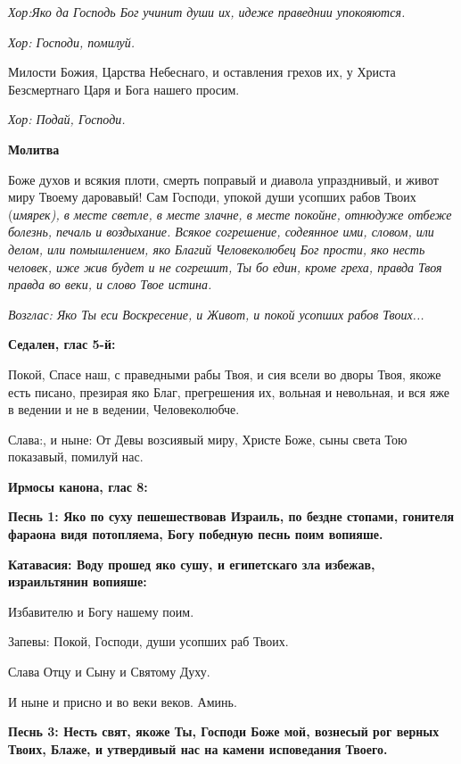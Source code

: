 \itshape Хор:Яко да Господь Бог учинит души их, идеже праведнии упокояются. 

\normalfont{}\itshape Хор:\normalfont{} Господи, помилуй. 

Милости Божия, Царства Небеснаго, и оставления грехов их, у Христа Безсмертнаго Царя и Бога нашего просим. 

\itshape Хор:\normalfont{} Подай, Господи.


\medskip


\bfseries Молитва\normalfont{}


Боже духов и всякия плоти, смерть поправый и диавола упразднивый, и живот миру Твоему даровавый! Сам Господи, упокой души усопших рабов Твоих (\itshape имярек\normalfont{}), в месте светле, в месте злачне, в месте покойне, отнюдуже отбеже болезнь, печаль и воздыхание. Всякое согрешение, содеянное ими, словом, или делом, или помышлением, яко Благий Человеколюбец Бог прости, яко несть человек, иже жив будет и не согрешит, Ты бо един, кроме греха, правда Твоя правда во веки, и слово Твое истина. 

\itshape Возглас:\normalfont{} Яко Ты еси Воскресение, и Живот, и покой усопших рабов Твоих...


\medskip


\bfseries Седален, глас 5-й:\normalfont{}


Покой, Спасе наш, с праведными рабы Твоя, и сия всели во дворы Твоя, якоже есть писано, презирая яко Благ, прегрешения их, вольная и невольная, и вся яже в ведении и не в ведении, Человеколюбче. 

Слава:, и ныне: От Девы возсиявый миру, Христе Боже, сыны света Тою показавый, помилуй нас.


\medskip


\bfseries Ирмосы канона, глас 8:\normalfont{}


\bfseries Песнь 1:\normalfont{} Яко по суху пешешествовав Израиль, по бездне стопами, гонителя фараона видя потопляема, Богу победную песнь поим вопияше. 

\bfseries Катавасия:\normalfont{} Воду прошед яко сушу, и египетскаго зла избежав, израильтянин вопияше: 

Избавителю и Богу нашему поим. 

Запевы: Покой, Господи, души усопших раб Твоих. 

Слава Отцу и Сыну и Святому Духу. 

И ныне и присно и во веки веков. Аминь.


\bfseries Песнь 3:\normalfont{} Несть свят, якоже Ты, Господи Боже мой, вознесый рог верных Твоих, Блаже, и утвердивый нас на камени исповедания Твоего. 

